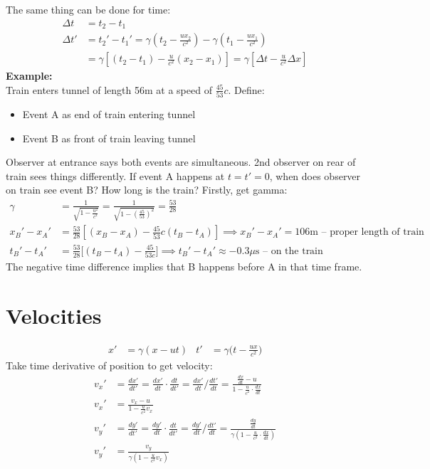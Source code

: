 \documentclass[a4paper, 11pt, normalem]{report}
\begin{document}
The same thing can be done for time:
\begin{align}
    \Delta t &= t_{2} - t_{1} \\
    \Delta t' &= t_{2}' -t_{1}' = \gamma(t_{2} - \frac{ux_{2}}{c^{2}}) - \gamma(t_{1} - \frac{ux_{1}}{c^{2}}) \\
              &= \gamma[(t_{2} - t_{1}) - \frac{u}{c^{2}}(x_{2} - x_{1})] = \gamma[\Delta t - \frac{u}{c^{2}}\Delta x]
\end{align}
\textbf{Example:}\\
Train enters tunnel of length 56m at a speed of $\frac{45}{53}c$.
Define:
\begin{itemize}
    \item Event A as end of train entering tunnel
    \item Event B as front of train leaving tunnel
\end{itemize}
Observer at entrance says both events are simultaneous.
2nd observer on rear of train sees things differently.
If event A happens at $t = t' = 0$, when does observer on train see event B?
How long is the train?
Firstly, get gamma:
\begin{align}
    \gamma &= \frac{1}{\sqrt{1 - \tfrac{u^{2}}{c^{2}}}} = \frac{1}{\sqrt{1 - (\tfrac{45}{53})^{2}}} = \frac{53}{28} \\
    x_{B}' - x_{A}' &= \frac{53}{28}[(x_{B} - x_{A}) - \frac{45}{53}c(t_{B} - t_{A})] \implies x_{B}' -x_{A}' = 106\text{m -- proper length of train} \\
    t_{B}' - t_{A}' &= \frac{53}{28}\Big[(t_{B} - t_{A}) - \frac{45}{53c}\Big] \implies t_{B}' - t_{A}' \approx -0.3\mu\text{s -- on the train}
\end{align}
The negative time difference implies that B happens before A in that time frame.

\section{Velocities}
\begin{align}
    x' &= \gamma(x - ut) & t' &= \gamma\Big(t - \frac{ux}{c^{2}}\Big)
\end{align}
Take time derivative of position to get velocity:
\begin{align}
    v_{x}' &= \frac{dx'}{dt'} = \frac{dx'}{dt}\cdot\frac{dt}{dt'} = \frac{dx'}{dt}\Big/\frac{dt'}{dt} = \frac{\tfrac{dx}{dt} - u}{1 - \tfrac{u}{c^{2}}\cdot\tfrac{dx}{dt}} \\
    v_{x}' &= \frac{v_{x} - u}{1 - \tfrac{u}{c^{2}}v_{x}} \\
    v_{y}' &= \frac{dy'}{dt'} = \frac{dy'}{dt}\cdot\frac{dt}{dt'} = \frac{dy'}{dt}\Big/\frac{dt'}{dt} = \frac{\tfrac{dy}{dt}}{\gamma(1 - \tfrac{u}{c^{2}}\cdot\tfrac{dx}{dt})} \\
    v_{y}' &= \frac{v_{y}}{\gamma(1 - \tfrac{u}{c^{2}}v_{x})}
\end{align}
\end{document}
